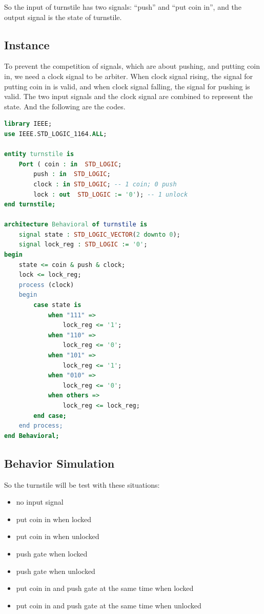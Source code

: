 \documentclass{article}
\begin{document}
    So the input of turnstile has two signals: ``push'' and ``put coin in'', and the output signal is the state of turnstile.
    
    \subsection{Instance}
    \label{sec:turnstile:instance}
    
    To prevent the competition of signals, which are about pushing, and putting coin in, we need a clock signal to be arbiter. When clock signal rising,
    the signal for putting coin in is valid, and when clock signal falling,
    the signal for pushing is valid.
    The two input signals and the clock signal are combined to represent the state.
    And the following are the codes.
    
    \begin{lstlisting}[language=VHDL,caption=Turnstile Codes]
library IEEE;
use IEEE.STD_LOGIC_1164.ALL;

entity turnstile is
    Port ( coin : in  STD_LOGIC;
        push : in  STD_LOGIC;
        clock : in STD_LOGIC; -- 1 coin; 0 push
        lock : out  STD_LOGIC := '0'); -- 1 unlock
end turnstile;

architecture Behavioral of turnstile is
    signal state : STD_LOGIC_VECTOR(2 downto 0);
    signal lock_reg : STD_LOGIC := '0';
begin
    state <= coin & push & clock;
    lock <= lock_reg;
    process (clock)
    begin
        case state is
            when "111" => 
                lock_reg <= '1';
            when "110" =>
                lock_reg <= '0';
            when "101" =>
                lock_reg <= '1';
            when "010" =>
                lock_reg <= '0';
            when others =>
                lock_reg <= lock_reg;
        end case;
    end process;
end Behavioral;
    \end{lstlisting}
    
    \subsection{Behavior Simulation}
    
    So the turnstile will be test with these situations:
    \begin{itemize}
        \item no input signal
        \item put coin in when locked
        \item put coin in when unlocked
        \item push gate when locked
        \item push gate when unlocked
        \item put coin in and push gate at the same time when locked
        \item put coin in and push gate at the same time when unlocked
    \end{itemize}
    
\end{document}
